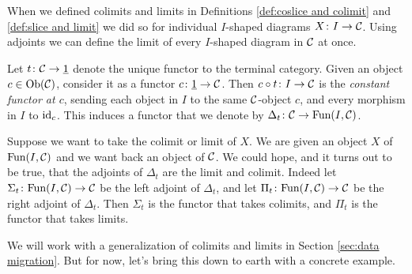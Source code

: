 \documentclass[CT4S-EN-RU]{subfiles}
\begin{document}
When we defined colimits and limits in Definitions \ref{def:coslice and colimit} and \ref{def:slice and limit} we did so for individual $I$-shaped diagrams $X\colon I\rightarrow\mathcal{C}$. Using adjoints we can define the limit of every $I$-shaped diagram in $\mathcal{C}$ at once.

Let $t\colon\mathcal{C}\rightarrow\underline{1}$ denote the unique functor to the terminal category. Given an object $c\in\textnormal{Ob}(\mathcal{C})$, consider it as a functor $c\colon\underline{1}\rightarrow\mathcal{C}$. Then $c\circ t\colon I\rightarrow\mathcal{C}$ is the {\em constant functor at $c$}, sending each object in $I$ to the same $\mathcal{C}$-object $c$, and every morphism in $I$ to $\textnormal{id}_c$. This induces a functor that we denote by $\Delta_t\colon\mathcal{C}\rightarrow\textnormal{Fun}(I,\mathcal{C})$.

Suppose we want to take the colimit or limit of $X$. We are given an object $X$ of $\textnormal{Fun}(I,\mathcal{C})$ and we want back an object of $\mathcal{C}$. We could hope, and it turns out to be true, that the adjoints of $\Delta_t$ are the limit and colimit. Indeed let $\Sigma_t\colon\textnormal{Fun}(I,\mathcal{C})\rightarrow\mathcal{C}$ be the left adjoint of $\Delta_t$, and let $\Pi_t\colon\textnormal{Fun}(I,\mathcal{C})\rightarrow\mathcal{C}$ be the right adjoint of $\Delta_t$. Then $\Sigma_t$ is the functor that takes colimits, and $\Pi_t$ is the functor that takes limits.

We will work with a generalization of colimits and limits in Section \ref{sec:data migration}. But for now, let's bring this down to earth with a concrete example.
\end{document}
